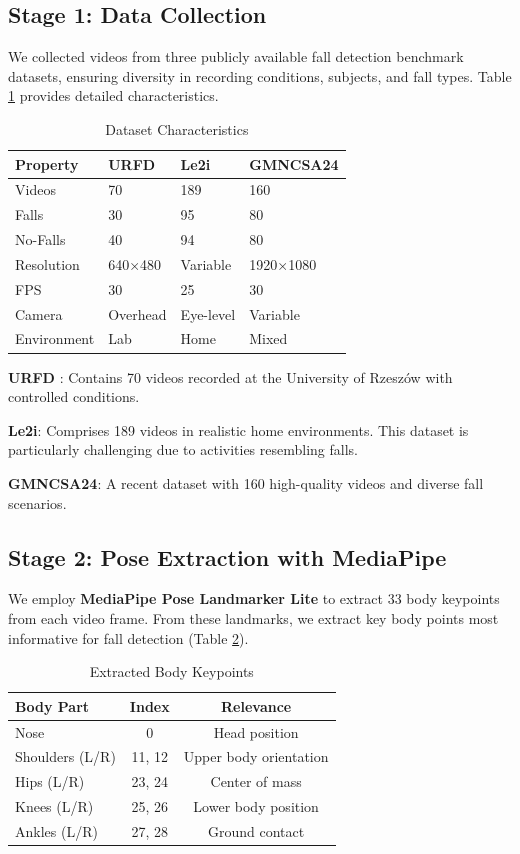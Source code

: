 \documentclass[conference]{IEEEtran}
\begin{document}
\subsection{Stage 1: Data Collection}

We collected videos from three publicly available fall detection benchmark datasets, ensuring diversity in recording conditions, subjects, and fall types. Table \ref{tab:dataset_details} provides detailed characteristics.

\begin{table}[H]
\centering
\caption{Dataset Characteristics}
\label{tab:dataset_details}
\begin{tabular}{p{1.5cm}p{1.8cm}p{1.8cm}p{1.8cm}}
\toprule
\textbf{Property} & \textbf{URFD} & \textbf{Le2i} & \textbf{GMNCSA24} \\
\midrule
Videos & 70 & 189 & 160 \\
Falls & 30 & 95 & 80 \\
No-Falls & 40 & 94 & 80 \\
Resolution & 640×480 & Variable & 1920×1080 \\
FPS & 30 & 25 & 30 \\
Camera & Overhead & Eye-level & Variable \\
Environment & Lab & Home & Mixed \\
\bottomrule
\end{tabular}
\end{table}

\textbf{URFD} \cite{kwolek2014human}: Contains 70 videos recorded at the University of Rzeszów with controlled conditions.

\textbf{Le2i}: Comprises 189 videos in realistic home environments. This dataset is particularly challenging due to activities resembling falls.

\textbf{GMNCSA24}: A recent dataset with 160 high-quality videos and diverse fall scenarios.

\subsection{Stage 2: Pose Extraction with MediaPipe}

We employ \textbf{MediaPipe Pose Landmarker Lite} to extract 33 body keypoints from each video frame. From these landmarks, we extract key body points most informative for fall detection (Table \ref{tab:keypoints}).

\begin{table}[H]
\centering
\caption{Extracted Body Keypoints}
\label{tab:keypoints}
\begin{tabular}{lcc}
\toprule
\textbf{Body Part} & \textbf{Index} & \textbf{Relevance} \\
\midrule
Nose & 0 & Head position \\
Shoulders (L/R) & 11, 12 & Upper body orientation \\
Hips (L/R) & 23, 24 & Center of mass \\
Knees (L/R) & 25, 26 & Lower body position \\
Ankles (L/R) & 27, 28 & Ground contact \\
\bottomrule
\end{tabular}
\end{table}
\end{document}
